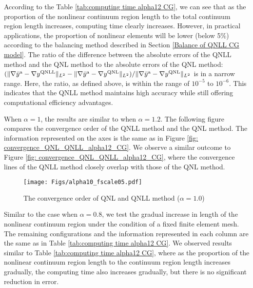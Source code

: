 According to the Table \ref{tab:computing time alpha12 CG}, we can see that as the proportion of the nonlinear continuum region length to the total continuum region length increases, computing time clearly increases. However, in practical applications, the proportion of nonlinear elements will be lower (below 5$\%$) according to the balancing method described in Section \ref{Balance of QNLL CG model}. The ratio of the difference between the absolute errors of the QNLL method and the QNL method to the absolute errors of the QNL method: $( \Vert \nabla \bar{y}^{{\rm a}} - \nabla y^{\text{QNLL}} \Vert_{L^{2}} - \Vert \nabla \bar{y}^{{\rm a}} - \nabla y^{\text{QNL}} \Vert_{L^{2}}) / \Vert \nabla \bar{y}^{{\rm a}} - \nabla y^{\text{QNL}} \Vert_{L^{2}}$ is in a narrow range. Here, the ratio, as defined above, is within the range of $10^{-5}$ to $10^{-6}$. This indicates that the QNLL method maintains high accuracy while still offering computational efficiency advantages.

When $\alpha = 1$, the results are similar to when $\alpha = 1.2$. The following figure compares the convergence order of the QNLL method and the QNL method. The information represented on the axes is the same as in Figure \ref{fig: convergence_QNL_QNLL_alpha12_CG}. We observe a similar outcome to Figure \ref{fig: convergence_QNL_QNLL_alpha12_CG}, where the convergence lines of the QNLL method closely overlap with those of the QNL method.

\begin{figure}[h]
	\centering 
	\texttt{[image: Figs/alpha10\_fscale05.pdf]}
	\caption{The convergence order of QNL and QNLL method ($\alpha = 1.0$)} %
	\label{fig: convergence_QNL_QNLL_alpha10_CG}
\end{figure}

Similar to the case when $\alpha = 0.8$, we test the gradual increase in length of the nonlinear continuum region under the condition of a fixed finite element mesh. The remaining configurations and the information represented in each column are the same as in Table  \ref{tab:computing time alpha12 CG}. We observed results similar to Table \ref{tab:computing time alpha12 CG}, where as the proportion of the nonlinear continuum region length to the continuum region length increases gradually, the computing time also increases gradually, but there is no significant reduction in error.

